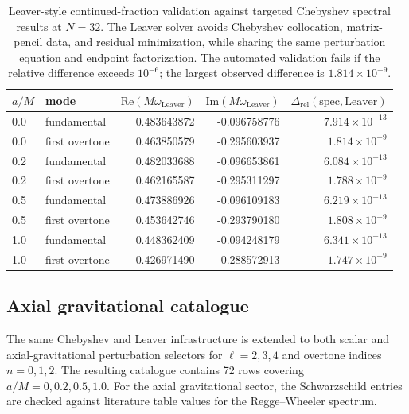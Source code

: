 \documentclass[10pt,letterpaper,twocolumn]{article}
\begin{document}
\begin{table}[t]
\centering
\footnotesize
\renewcommand{\arraystretch}{1.14}
\begin{tabular}{llrrr}
\toprule
\(a/M\) & mode &
\(\mathrm{Re}(M\omega_{\mathrm{Leaver}})\) &
\(\mathrm{Im}(M\omega_{\mathrm{Leaver}})\) &
\(\Delta_{\mathrm{rel}}(\mathrm{spec},\mathrm{Leaver})\)\\
\midrule
0.0 & fundamental & 0.483643872 & -0.096758776 & \(7.914\times10^{-13}\)\\
0.0 & first overtone & 0.463850579 & -0.295603937 & \(1.814\times10^{-9}\)\\
0.2 & fundamental & 0.482033688 & -0.096653861 & \(6.084\times10^{-13}\)\\
0.2 & first overtone & 0.462165587 & -0.295311297 & \(1.788\times10^{-9}\)\\
0.5 & fundamental & 0.473886926 & -0.096109183 & \(6.219\times10^{-13}\)\\
0.5 & first overtone & 0.453642746 & -0.293790180 & \(1.808\times10^{-9}\)\\
1.0 & fundamental & 0.448362409 & -0.094248179 & \(6.341\times10^{-13}\)\\
1.0 & first overtone & 0.426971490 & -0.288572913 & \(1.747\times10^{-9}\)\\
\bottomrule
\end{tabular}
\caption{Leaver-style continued-fraction validation against targeted Chebyshev spectral results at \(N=32\). The Leaver solver avoids Chebyshev collocation, matrix-pencil data, and residual minimization, while sharing the same perturbation equation and endpoint factorization. The automated validation fails if the relative difference exceeds \(10^{-6}\); the largest observed difference is \(1.814\times10^{-9}\).}
\label{tab:leavercomparison}
\end{table}

\subsection{Axial gravitational catalogue}

The same Chebyshev and Leaver infrastructure is extended to both scalar and axial-gravitational perturbation selectors for \(\ell=2,3,4\) and overtone indices \(n=0,1,2\). The resulting catalogue contains 72 rows covering \(a/M=0,0.2,0.5,1.0\). For the axial gravitational sector, the Schwarzschild entries are checked against literature table values for the Regge--Wheeler spectrum.
\end{document}
